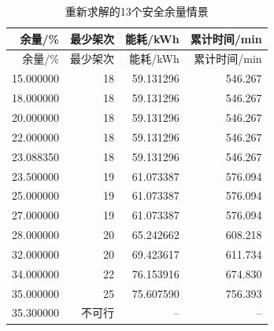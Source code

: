 \begin{longtable}{@{}rrrr@{}}
\caption{重新求解的13个安全余量情景}\label{tab:app_q1_reserve}\\
\toprule
余量/\% & 最少架次 & 能耗/kWh & 累计时间/min\\
\midrule
\endfirsthead
\toprule
余量/\% & 最少架次 & 能耗/kWh & 累计时间/min\\
\midrule
\endhead
15.000000 & 18 & 59.131296 & 546.267\\
18.000000 & 18 & 59.131296 & 546.267\\
20.000000 & 18 & 59.131296 & 546.267\\
22.000000 & 18 & 59.131296 & 546.267\\
23.088350 & 18 & 59.131296 & 546.267\\
23.500000 & 19 & 61.073387 & 576.094\\
25.000000 & 19 & 61.073387 & 576.094\\
27.000000 & 19 & 61.073387 & 576.094\\
28.000000 & 20 & 65.242662 & 608.218\\
32.000000 & 20 & 69.423617 & 611.734\\
34.000000 & 22 & 76.153916 & 674.830\\
35.000000 & 25 & 75.607590 & 756.393\\
35.300000 & 不可行 & -- & --\\
\bottomrule
\end{longtable}
